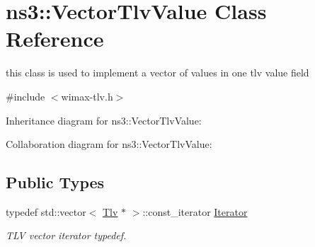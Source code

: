 \hypertarget{classns3_1_1VectorTlvValue}{}\section{ns3\+:\+:Vector\+Tlv\+Value Class Reference}
\label{classns3_1_1VectorTlvValue}


this class is used to implement a vector of values in one tlv value field  




{\ttfamily \#include $<$wimax-\/tlv.\+h$>$}



Inheritance diagram for ns3\+:\+:Vector\+Tlv\+Value\+:


Collaboration diagram for ns3\+:\+:Vector\+Tlv\+Value\+:
\subsection*{Public Types}
\begin{DoxyCompactItemize}
\item 
typedef std\+::vector$<$ \hyperlink{classns3_1_1Tlv}{Tlv} $\ast$ $>$\+::const\+\_\+iterator \hyperlink{classns3_1_1VectorTlvValue_a7b80a0076eb50f48943f779bb952a1e9}{Iterator}
\begin{DoxyCompactList}\small\item\em T\+LV vector iterator typedef. \end{DoxyCompactList}\end{DoxyCompactItemize}
